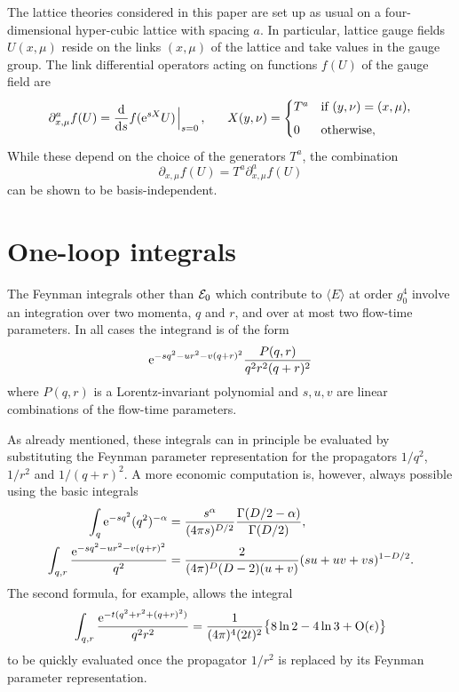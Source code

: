 The lattice theories considered in this paper are
set up as usual on a four-dimen\-sional hyper-cubic
lattice with spacing $a$. In particular, lattice gauge fields $U(x,\mu)$
reside on the links
$(x,\mu)$ of the lattice and take values in the gauge group.
The link differential operators acting on functions
$f(U)$ of the gauge field are
\begin{equation}
  \partial^a_{x,\mu}f(U)=
  {\rmd\over\rmd s}f(\rme^{sX}U)\!\left.\vphantom{\frac{r}{s}}\right|_{s=0},
  \hskip1.7em
  X(y,\nu)=\begin{cases}T^a & \text{if $(y,\nu)=(x,\mu)$,}\\[1ex]
                        0  & \text{otherwise},\end{cases}
  \label{eq:linkderivatives}
\end{equation}
While these depend on the choice of the generators $T^a$,
the combination
\begin{equation}
  \partial_{x,\mu}f(U)=T^a\partial^a_{x,\mu}f(U)
  \label{eq:covlinkderivative}
\end{equation}
can be shown to be basis-independent.

\section{One-loop integrals}\label{app:B}

The Feynman integrals other than ${\cal E}_0$ which contribute to
$\langle E\rangle$ at order $g_0^4$ involve an integration over
two momenta, $q$ and $r$, and over at most two
flow-time parameters. In all cases the integrand is of the
form
\begin{equation}
  \mathrm{e}^{-sq^2-ur^2-v(q+r)^2}{P(q,r)\over q^2r^2(q+r)^2}
\end{equation}
where $P(q,r)$ is a Lorentz-invariant polynomial and $s,u,v$ are linear
combinations of the flow-time parameters.

As already mentioned, these integrals can in principle be evaluated by
substituting the Feynman parameter representation for the propagators
$1/q^2$, $1/r^2$ and $1/(q+r)^2$.
A more economic computation is, however, always possible
using the basic integrals
\begin{align}
  \int_q\mathrm{e}^{-sq^2}(q^2)^{-\alpha}&={s^{\alpha}\over(4\pi s)^{D/2}}
  {\Gamma(D/2-\alpha)\over\Gamma(D/2)},
  \\
  \int_{q,r}{\mathrm{e}^{-sq^2-ur^2-v(q+r)^2}\over q^2}&=
  {2\over(4\pi)^D(D-2)(u+v)}(su+uv+vs)^{1-D/2}.
  \label{eq:basicintegralB}
\end{align}
The second formula, for example, allows the integral
\begin{equation}
  \int_{q,r}
  {\mathrm{e}^{-t(q^2+r^2+(q+r)^2)}\over q^2r^2}=
  {1\over(4\pi)^4(2t)^2}\bigl\{8\ln2-4\ln3+\mathrm{O}(\epsilon)\bigr\}
\end{equation}
to be quickly evaluated once the propagator $1/r^2$ is replaced
by its Feynman parameter representation.

